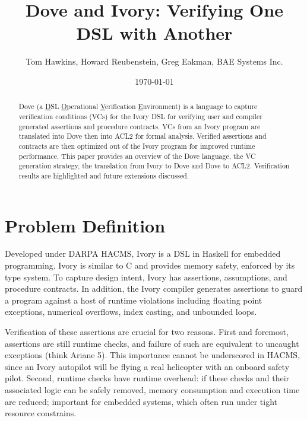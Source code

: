 \documentclass{article}
\begin{document}
\title{Dove and Ivory: Verifying One DSL with Another}
\author{Tom Hawkins, Howard Reubenstein, Greg Eakman, BAE Systems Inc.}
\date{\today}
\maketitle

\begin{abstract}
Dove (a \underline{D}SL \underline{O}perational \underline{V}erification \underline{E}nvironment)
is a language to capture verification conditions (VCs) for the 
Ivory DSL for verifying user and compiler generated assertions
and procedure contracts.  VCs from an Ivory program are
translated into Dove then into ACL2 for formal analysis.
Verified assertions and contracts are then optimized out of
the Ivory program for improved runtime performance.
This paper provides an overview of the Dove language,
the VC generation strategy, the translation from Ivory to Dove
and Dove to ACL2.  Verification results are highlighted
and future extensions discussed.
\end{abstract}


\section{Problem Definition}

Developed under DARPA HACMS, Ivory is a DSL in Haskell for 
embedded programming.  Ivory is similar to C and provides
memory safety, enforced by its type system.
To capture design intent, Ivory has
assertions, assumptions, and procedure contracts.
In addition, the Ivory compiler generates
assertions to guard a program against a host of runtime violations including
floating point exceptions, numerical overflows, index casting, and unbounded loops.

Verification of these assertions are crucial for two reasons.  First and foremost,
assertions are still runtime checks, and failure of such are equivalent 
to uncaught exceptions (think Ariane 5).  This importance cannot
be underscored in HACMS, since an Ivory autopilot will be flying a real helicopter
with an onboard safety pilot.  Second, runtime checks have
runtime overhead: if these checks and their associated logic can be safely
removed, memory consumption and execution time are reduced; important 
for embedded systems, which often run under tight resource constrains.
\end{document}
